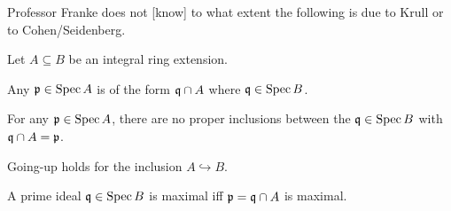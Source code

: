 \documentclass[a4paper,parskip=half,numbers=enddot, DIV=12]{scrreprt}
\begin{document}
	Professor Franke does not [know] to what extent the following is due to Krull or to Cohen/Seidenberg.
	\begin{thm}
		Let $A\subseteq B$ be an integral ring extension.
		\begin{alphanumerate}
		\item 
			 Any $\mathfrak{p}\in\operatorname{Spec} A$ is of the form  $\mathfrak{q}\cap A$ where $\mathfrak{q}\in\operatorname{Spec} B$.
		\item 
			For any $\mathfrak{p}\in \operatorname{Spec} A$, there are no proper inclusions between the $\mathfrak{q}\in\operatorname{Spec} B$ with $\mathfrak{q}\cap A = \mathfrak{p}$.
		\item
			Going-up holds for the inclusion $A\hookrightarrow B$.
		\item
			A prime ideal $\mathfrak{q}\in\operatorname{Spec} B$ is maximal iff $\mathfrak{p} = \mathfrak{q}\cap A$ is maximal.
		\end{alphanumerate}
	\end{thm}
\end{document}
